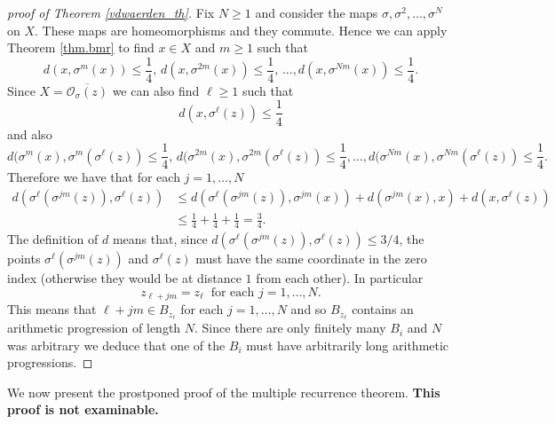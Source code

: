 \documentclass[12pt]{article}
\theoremstyle{definition}
\theoremstyle{remark}
\begin{document}
\begin{proof}[proof of Theorem \ref{vdwaerden_th}]
Fix $N \ge 1$ and consider the maps $\sigma, \sigma^2, \ldots, \sigma^N$ on $X$. These maps are homeomorphisms and they commute. Hence we can apply Theorem \ref{thm.bmr} to find $x \in X$ and $m \ge 1$ such that
\[
d(x,\sigma^m(x)) \le \frac{1}{4}, \, d(x,\sigma^{2m}(x)) \le \frac{1}{4}, \, \ldots, d(x, \sigma^{Nm}(x)) \le \frac{1}{4}.
\]
Since $X = \overline{\mathcal O_\sigma(z)}$ we can also find $\ell \ge 1$ such that
\[
d(x,\sigma^\ell(z)) \le \frac{1}{4} 
\]
and also
\[
d(\sigma^m(x), \sigma^m(\sigma^\ell(z)) \le \frac{1}{4}, \, d(\sigma^{2m}(x), \sigma^{2m}(\sigma^\ell(z)) \le \frac{1}{4}, \dots, d(\sigma^{Nm}(x), \sigma^{Nm}( \sigma^\ell(z)) \le \frac{1}{4}.
\]
Therefore we have that for each $j =1, \ldots, N$
\begin{align*}
d(\sigma^\ell(\sigma^{jm}(z)), \sigma^\ell(z)) &\le d(\sigma^\ell(\sigma^{jm}(z)), \sigma^{jm}(x)) + d(\sigma^{jm}(x), x) + d(x, \sigma^\ell(z))  \\
&\le \frac{1}{4} + \frac{1}{4} + \frac{1}{4} = \frac{3}{4}.
\end{align*}
The definition of $d$ means that, since $d(\sigma^\ell(\sigma^{jm}(z)), \sigma^\ell(z)) \le 3/4$, the points $\sigma^\ell(\sigma^{jm}(z))$ and $\sigma^\ell(z)$ must have the same coordinate in the zero index (otherwise they would be at distance $1$ from each other). In particular
\[
z_{\ell + jm} = z_\ell \ \text{ for each $j =1, \ldots, N$.}
\]
This means that $\ell + jm \in B_{z_\ell}$ for each $j=1, \ldots, N$ and so $B_{z_\ell}$ contains an arithmetic progression of length $N$. Since there are only finitely many $B_i$ and $N$ was arbitrary we deduce that one of the $B_i$ must have arbitrarily long arithmetic progressions.
\end{proof}

We now present the prostponed proof of the multiple recurrence theorem.
\textbf{This proof is not examinable.}
\end{document}
